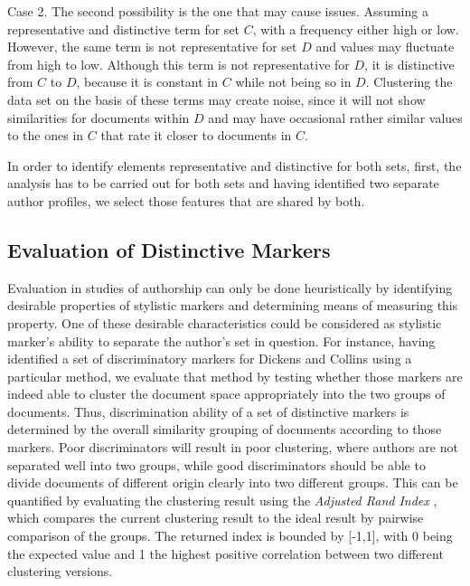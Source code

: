 \documentclass[a4paper,10pt,twoside,fleqn]{article}
\begin{document}
Case 2. The second possibility is the one that may cause issues.
Assuming a representative and distinctive term for set $C$, with a 
frequency either high or low. 
However, the same term is not representative for set $D$ and values 
may fluctuate from high to low. Although this term is not representative 
for $D$, it is distinctive from $C$ to $D$, because it is constant in $C$ 
while not being so in $D$. 
Clustering the data set on the basis of these terms may create noise, 
since it will not show similarities for documents within $D$ and 
may have occasional rather similar values to the ones in $C$ that 
rate it closer to documents in $C$.

In order to identify elements representative and distinctive for both sets,
first, the analysis has to be carried out for both sets and having identified
two separate author profiles, we select those features that are shared
by both.

\subsection{Evaluation of Distinctive Markers} \label{sec:evaluation}
Evaluation in studies of authorship can only be done heuristically
by identifying desirable properties of stylistic markers and
determining means of measuring this property. 
One of these desirable characteristics could be considered 
as stylistic marker's ability to separate the author's set in 
question. 
For instance, having identified a set of discriminatory markers
for Dickens and Collins using a particular method, we evaluate 
that method by testing whether those markers are indeed able to 
cluster the document space appropriately into the two groups of
documents. 
Thus, discrimination ability of a set of distinctive markers
is determined by the overall similarity grouping of documents 
according to those markers. 
Poor discriminators will result in poor clustering, where
authors are not separated well into two groups, while 
good discriminators should be able to divide documents of 
different origin clearly into two different groups. 
This can be quantified by evaluating the clustering result
using the \emph{Adjusted Rand Index} \cite{hubert1985comparing},
which compares the current clustering result to the ideal 
result by pairwise comparison of the groups. 
The returned index is bounded by [-1,1], with 0 being the 
expected value and 1 the highest positive correlation 
between two different clustering versions. 
\end{document}
